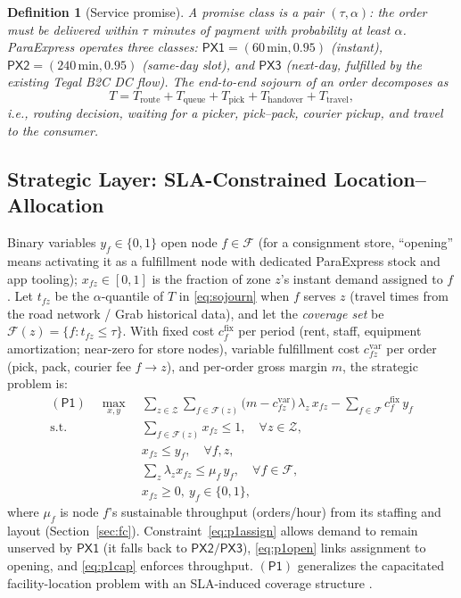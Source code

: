 \documentclass[journal]{IEEEtran}
\newtheorem{definition}{Definition}
\begin{document}
\begin{definition}[Service promise]
\label{def:sla}
A \emph{promise class} is a pair $(\tau, \alpha)$: the order must be delivered within $\tau$ minutes of payment with probability at least $\alpha$. ParaExpress operates three classes:
$\mathsf{PX1} = (60\,\text{min}, 0.95)$ (instant), $\mathsf{PX2} = (240\,\text{min}, 0.95)$ (same-day slot), and $\mathsf{PX3}$ (next-day, fulfilled by the existing Tegal B2C DC flow). The end-to-end sojourn of an order decomposes as
\begin{equation}
\label{eq:sojourn}
T = T_{\mathrm{route}} + T_{\mathrm{queue}} + T_{\mathrm{pick}} + T_{\mathrm{handover}} + T_{\mathrm{travel}},
\end{equation}
i.e., routing decision, waiting for a picker, pick--pack, courier pickup, and travel to the consumer.
\end{definition}

\subsection{Strategic Layer: SLA-Constrained Location--Allocation}

Binary variables $y_f \in \{0,1\}$ open node $f\in\mathcal{F}$ (for a consignment store, ``opening'' means activating it as a fulfillment node with dedicated ParaExpress stock and app tooling); $x_{fz} \in [0,1]$ is the fraction of zone $z$'s instant demand assigned to $f$. Let $t_{fz}$ be the $\alpha$-quantile of $T$ in \eqref{eq:sojourn} when $f$ serves $z$ (travel times from the road network / Grab historical data), and let the \emph{coverage set} be $\mathcal{F}(z) = \{f : t_{fz} \le \tau\}$. With fixed cost $c^{\mathrm{fix}}_f$ per period (rent, staff, equipment amortization; near-zero for store nodes), variable fulfillment cost $c^{\mathrm{var}}_{fz}$ per order (pick, pack, courier fee $f\!\to\!z$), and per-order gross margin $m$, the strategic problem is:
\begin{align}
(\mathsf{P1})\quad \max_{x,y}\ & \sum_{z\in\mathcal{Z}} \sum_{f \in \mathcal{F}(z)} \big(m - c^{\mathrm{var}}_{fz}\big)\, \lambda_z\, x_{fz} - \sum_{f\in\mathcal{F}} c^{\mathrm{fix}}_f\, y_f \label{eq:p1obj}\\
\text{s.t. } & \textstyle\sum_{f \in \mathcal{F}(z)} x_{fz} \le 1, \quad \forall z \in \mathcal{Z}, \label{eq:p1assign}\\
& x_{fz} \le y_f, \quad \forall f, z, \label{eq:p1open}\\
& \textstyle\sum_{z} \lambda_z x_{fz} \le \mu_f\, y_f, \quad \forall f \in \mathcal{F}, \label{eq:p1cap}\\
& x_{fz} \ge 0,\ y_f \in \{0,1\}, \nonumber
\end{align}
where $\mu_f$ is node $f$'s sustainable throughput (orders/hour) from its staffing and layout (Section~\ref{sec:fc}). Constraint~\eqref{eq:p1assign} allows demand to remain unserved by $\mathsf{PX1}$ (it falls back to $\mathsf{PX2}/\mathsf{PX3}$), \eqref{eq:p1open} links assignment to opening, and \eqref{eq:p1cap} enforces throughput. $(\mathsf{P1})$ generalizes the capacitated facility-location problem \cite{daskin,melo} with an SLA-induced coverage structure \cite{church}.
\end{document}

